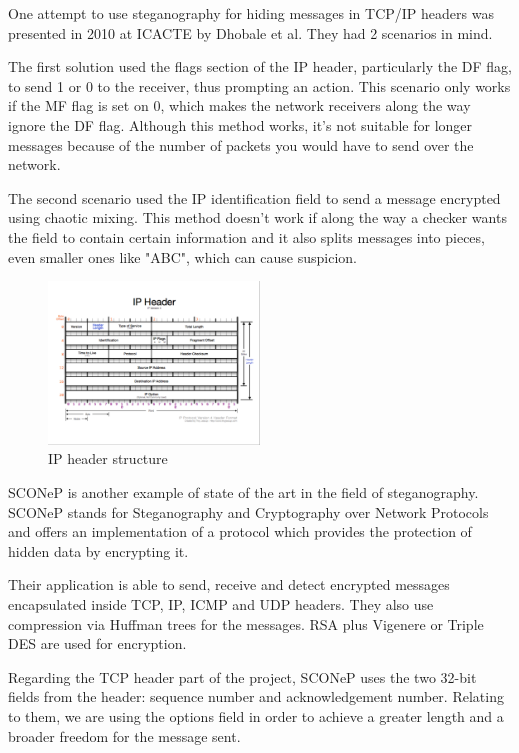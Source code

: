 
One attempt to use steganography for hiding messages in TCP/IP headers was
presented in 2010 at ICACTE by Dhobale et al\cite{stegano-hiding-data}. They had 2
scenarios in mind.

The first solution used the flags section of the IP header, particularly the DF flag, to send
1 or 0 to the receiver, thus prompting an action. This scenario only works if
the MF flag is set on 0, which makes the network receivers along the way 
ignore the DF flag. Although this method works, it's not suitable for longer
messages because of the number of packets you would have to send over the
network.

The second scenario used the IP identification field to send a message encrypted using chaotic
mixing. This method doesn't work if along the way a checker wants the field to
contain certain information and it also splits messages into pieces, even
smaller ones like "ABC", which can cause suspicion.

\begin{figure}
  \centering
  \includegraphics[width=0.5\textwidth]{img/IPHeader}
  \caption{IP header structure}
  \label{fig:related}
\end{figure}

SCONeP\cite{ciobanu2011sconep} is another example of state of the art in the
field of steganography. SCONeP stands for Steganography and Cryptography over
Network Protocols and offers an implementation of a protocol which provides
the protection of hidden data by encrypting it.

Their application is able to send, receive and detect encrypted messages
encapsulated inside TCP, IP, ICMP and UDP headers. They also use compression
via Huffman trees for the messages. RSA plus Vigenere or Triple DES are used
for encryption.

Regarding the TCP header part of the project, SCONeP uses the two 32-bit
fields from the header: sequence number and acknowledgement number. Relating
to them, we are using the options field in order to achieve a greater length
and a broader freedom for the message sent.
